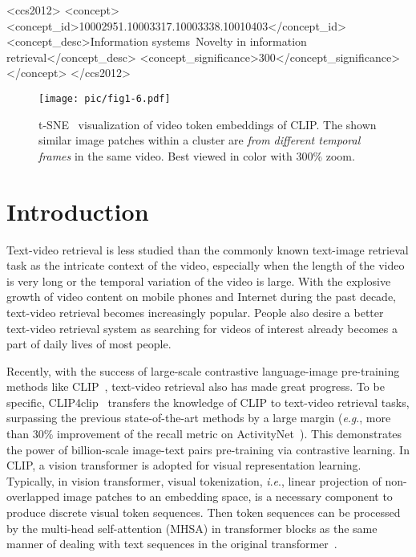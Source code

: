\documentclass[sigconf]{acmart}
\newcommand{\ie}{\textit{i}.\textit{e}.}
\newcommand{\eg}{\textit{e}.\textit{g}.}
\begin{document}
\begin{CCSXML}
	<ccs2012>
	<concept>
	<concept_id>10002951.10003317.10003338.10010403</concept_id>
	<concept_desc>Information systems~Novelty in information retrieval</concept_desc>
	<concept_significance>300</concept_significance>
	</concept>
	</ccs2012>
\end{CCSXML}


\maketitle

\begin{figure}[!t]
	\centering
	\texttt{[image: pic/fig1-6.pdf]}
	\caption{t-SNE~\cite{2008Visualizing} visualization of video token embeddings of CLIP.
		The shown similar image patches within a cluster are \textit{from different 
		temporal frames} in the same video.
		Best viewed in color with 300\% zoom.}
	\label{fig:tsne}
\end{figure}

\section{Introduction}

Text-video retrieval is less studied than the commonly known
text-image retrieval task as the intricate context of the video,
especially when the length of the video is very long or the
temporal variation of the video is large.
With the explosive growth of video content on mobile phones
and Internet during the past decade,
text-video retrieval becomes increasingly popular.
People also desire a better text-video retrieval system
as searching for videos of interest already becomes a part of
daily lives of most people.


Recently, with the success of large-scale 
contrastive language-image
pre-training methods like CLIP~\cite{2021-clip},
text-video retrieval also has made great progress.
To be specific, CLIP4clip~\cite{2021clip4clip} transfers the knowledge of CLIP to text-video retrieval tasks, surpassing the previous state-of-the-art methods by a large margin (\eg, more than 30\% improvement of the recall metric
on ActivityNet~\cite{caba2015activitynet}).
This demonstrates the power of billion-scale image-text pairs pre-training
via contrastive learning.
In CLIP, a vision transformer
\cite{DBLP:conf/nips/VaswaniSPUJGKP17,2021-vit} is adopted for visual representation 
learning.
Typically, in vision transformer, visual tokenization,
\ie, linear projection of non-overlapped image patches to an embedding space,
is a necessary component to produce discrete visual token sequences.
Then token sequences can be processed by the multi-head self-attention (MHSA)
in transformer blocks as the same manner of dealing with text sequences in the
original transformer~\cite{DBLP:conf/nips/VaswaniSPUJGKP17}.
\end{document}
